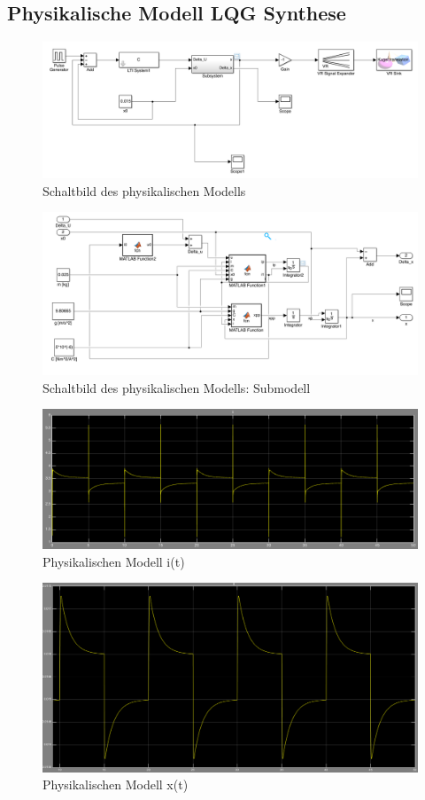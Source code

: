 \documentclass[10pt,a4paper]{article}
\begin{document}
\subsection{Physikalische Modell LQG Synthese}

\begin{figure}[H]
\centering
\includegraphics[width=1\linewidth]{screens/physikalisch_gesamt}
\caption{Schaltbild des physikalischen Modells}
\label{fig:physikalisch_gesamt}
\end{figure}

\begin{figure}[H]
\centering
\includegraphics[width=1\linewidth]{screens/physikalisch_sub}
\caption{Schaltbild des physikalischen Modells: Submodell}
\label{fig:physikalisch_sub}
\end{figure}

\begin{figure}[H]
\centering
\includegraphics[width=0.7\linewidth]{screens/physikalisch_i(t)}
\caption{Physikalischen Modell i(t)}
\label{fig:physikalisch_it}
\end{figure}

\begin{figure}[H]
\centering
\includegraphics[width=0.7\linewidth]{screens/physikalisch_x(t)}
\caption{Physikalischen Modell x(t)}
\label{fig:physikalisch_xt}
\end{figure}
\end{document}
